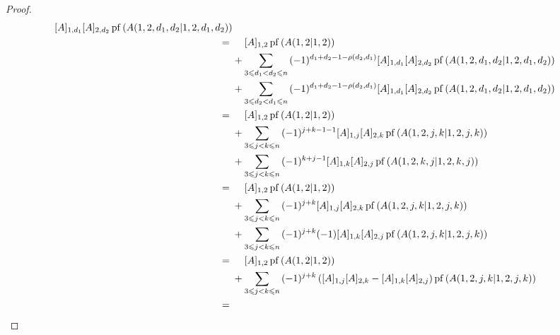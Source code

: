 \begin{proof}
\begin{align*}
{            [A]_{1,d_1} [A]_{2,d_2}
        \operatorname{pf} {(A({1,2,d_1,d_2}|{1,2,d_1,d_2}))}
        }
        \\
        = {} &
        \hphantom{{} + {}}
        [A]_{1,2}
        \operatorname{pf} {(A({1,2}|{1,2}))}
        \\
             &
        +
        \sum_{3 \leq d_1 < d_2 \leq n}
        {
        (-1)^{d_1 + d_2 - 1 - \rho(d_2, d_1)}
            [A]_{1,d_1} [A]_{2,d_2}
        \operatorname{pf} {(A({1,2,d_1,d_2}|{1,2,d_1,d_2}))}
        }
        \\
             &
        +
        \sum_{3 \leq d_2 < d_1 \leq n}
        {
        (-1)^{d_1 + d_2 - 1 - \rho(d_2, d_1)}
            [A]_{1,d_1} [A]_{2,d_2}
        \operatorname{pf} {(A({1,2,d_1,d_2}|{1,2,d_1,d_2}))}
        }
        \\
        = {} &
        \hphantom{{} + {}}
        [A]_{1,2}
        \operatorname{pf} {(A({1,2}|{1,2}))}
        \\
             &
        +
        \sum_{3 \leq j < k \leq n}
        {
        (-1)^{j + k - 1 - 1}
            [A]_{1,j} [A]_{2,k}
        \operatorname{pf} {(A({1,2,j,k}|{1,2,j,k}))}
        }
        \\
             &
        +
        \sum_{3 \leq j < k \leq n}
        {
        (-1)^{k + j - 1}
            [A]_{1,k} [A]_{2,j}
        \operatorname{pf} {(A({1,2,k,j}|{1,2,k,j}))}
        }
        \\
        = {} &
        \hphantom{{} + {}}
        [A]_{1,2}
        \operatorname{pf} {(A({1,2}|{1,2}))}
        \\
             &
        +
        \sum_{3 \leq j < k \leq n}
        {
        (-1)^{j + k}
            [A]_{1,j} [A]_{2,k}
        \operatorname{pf} {(A({1,2,j,k}|{1,2,j,k}))}
        }
        \\
             &
        +
        \sum_{3 \leq j < k \leq n}
        {
        (-1)^{j + k}
        (-1) [A]_{1,k} [A]_{2,j}
        \operatorname{pf} {(A({1,2,j,k}|{1,2,j,k}))}
        }
        \\
        = {} &
        \hphantom{{} + {}}
        [A]_{1,2}
        \operatorname{pf} {(A({1,2}|{1,2}))}
        \\
             &
        +
        \sum_{3 \leq j < k \leq n}
        {
        (-1)^{j + k}\,
        ([A]_{1,j} [A]_{2,k} - [A]_{1,k} [A]_{2,j})
        \operatorname{pf} {(A({1,2,j,k}|{1,2,j,k}))}
        }
        \\
        = {} &
        \hphantom{{} + {}}

\end{align*}
\end{proof}

